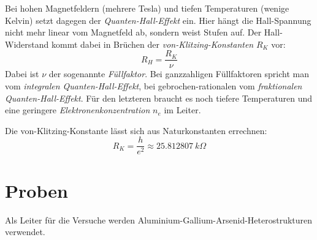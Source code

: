 \documentclass[a4paper]{article}
\begin{document}
Bei hohen Magnetfeldern (mehrere Tesla) und
tiefen Temperaturen (wenige Kelvin)
setzt dagegen der \emph{Quanten-Hall-Effekt} ein.
Hier hängt die Hall-Spannung nicht mehr linear vom Magnetfeld ab,
sondern weist Stufen auf.
Der Hall-Widerstand kommt dabei in Brüchen
der \emph{von-Klitzing-Konstanten} $R_K$ vor:
\begin{equation} R_H = \frac{R_K}{\nu} \end{equation}
Dabei ist $\nu$ der sogenannte \emph{Füllfaktor}.
Bei ganzzahligen Füllfaktoren spricht man
vom \emph{integralen Quanten-Hall-Effekt},
bei gebrochen-rationalen
vom \emph{fraktionalen Quanten-Hall-Effekt}.
Für den letzteren braucht es noch tiefere Temperaturen
und eine geringere \emph{Elektronenkonzentration} $n_e$ im Leiter.

Die von-Klitzing-Konstante lässt sich aus Naturkonstanten errechnen:
\begin{equation}
R_K = \frac{h}{e^2} \approx \SI{25,812807}{k\Omega}
\end{equation}


\section*{Proben}

Als Leiter für die Versuche werden Aluminium-Gallium-Arsenid-Heterostrukturen verwendet.
\end{document}
